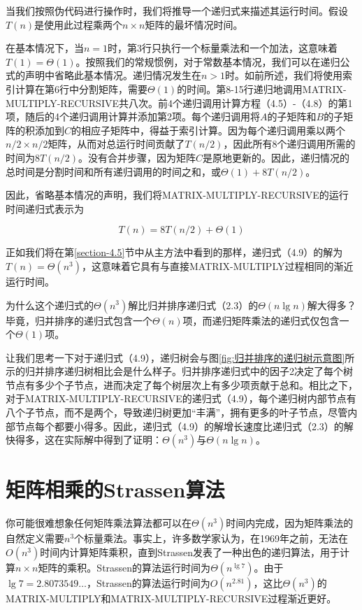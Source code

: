 \documentclass[lang=cn,newtx,10pt,scheme=chinese]{elegantbook}
\begin{document}
当我们按照伪代码进行操作时，我们将推导一个递归式来描述其运行时间。假设$T(n)$是使用此过程乘两个$n \times n$矩阵的最坏情况时间。

在基本情况下，当$n=1$时，第3行只执行一个标量乘法和一个加法，这意味着$T(1)=\Theta(1)$。按照我们的常规惯例，对于常数基本情况，我们可以在递归公式的声明中省略此基本情况。递归情况发生在$n>1$时。如前所述，我们将使用索引计算在第6行中分割矩阵，需要$\Theta(1)$的时间。第8-15行递归地调用MATRIX-MULTIPLY-RECURSIVE共八次。前4个递归调用计算方程（4.5）-（4.8）的第1项，随后的4个递归调用计算并添加第2项。每个递归调用将$A$的子矩阵和$B$的子矩阵的积添加到$C$的相应子矩阵中，得益于索引计算。因为每个递归调用乘以两个$n/2 \times n/2$矩阵，从而对总运行时间贡献了$T(n/2)$，因此所有8个递归调用所需的时间为$8 T(n/2)$。没有合并步骤，因为矩阵$C$是原地更新的。因此，递归情况的总时间是分割时间和所有递归调用的时间之和，或$\Theta(1)+8T(n/2)$。

因此，省略基本情况的声明，我们将MATRIX-MULTIPLY-RECURSIVE的运行时间递归式表示为

\begin{equation}
T(n)=8T(n/2)+\Theta(1)
\end{equation}

正如我们将在第\ref{section-4.5}节中从主方法中看到的那样，递归式（4.9）的解为$T(n)=\Theta(n^3)$，这意味着它具有与直接MATRIX-MULTIPLY过程相同的渐近运行时间。

为什么这个递归式的$\Theta(n^3)$解比归并排序递归式（2.3）的$\Theta(n\lg n)$解大得多？毕竟，归并排序的递归式包含一个$\Theta(n)$项，而递归矩阵乘法的递归式仅包含一个$\Theta(1)$项。

让我们思考一下对于递归式（4.9），递归树会与图\ref{fig:归并排序的递归树示意图}所示的归并排序递归树相比会是什么样子。归并排序递归式中的因子2决定了每个树节点有多少个子节点，进而决定了每个树层次上有多少项贡献于总和。相比之下，对于MATRIX-MULTIPLY-RECURSIVE的递归式（4.9），每个递归树内部节点有八个子节点，而不是两个，导致递归树更加``丰满''，拥有更多的叶子节点，尽管内部节点每个都要小得多。因此，递归式（4.9）的解增长速度比递归式（2.3）的解快得多，这在实际解中得到了证明：$\Theta(n^3)$与$\Theta(n \lg n)$。

\section{矩阵相乘的Strassen算法}\label{section-4.2}

你可能很难想象任何矩阵乘法算法都可以在$\Theta(n^3)$时间内完成，因为矩阵乘法的自然定义需要$n^3$个标量乘法。事实上，许多数学家认为，在1969年之前，无法在$O(n^3)$时间内计算矩阵乘积，直到Strassen发表了一种出色的递归算法，用于计算$n \times n$矩阵的乘积。Strassen的算法运行时间为$\Theta(n^{\lg 7})$。由于$\lg 7=2.8073549 \ldots$，Strassen的算法运行时间为$O(n^{2.81})$，这比$\Theta(n^3)$的MATRIX-MULTIPLY和MATRIX-MULTIPLY-RECURSIVE过程渐近更好。
\end{document}
